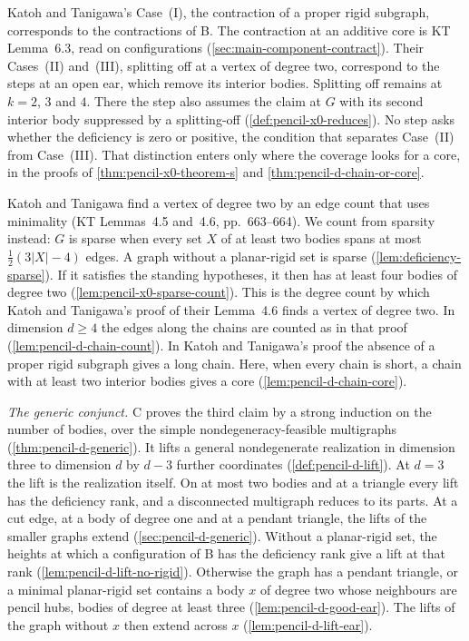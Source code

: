 Katoh and Tanigawa's Case~(I), the contraction of a proper rigid
subgraph, corresponds to the contractions of B. The contraction at an
additive core is KT Lemma~6.3, read on configurations
(\cref{sec:main-component-contract}). Their Cases~(II) and~(III),
splitting off at a vertex of degree two, correspond to the steps at an
open ear, which remove its interior bodies. Splitting off remains at $k
= 2$, $3$ and $4$. There the step also assumes the claim at $G$ with its
second interior body suppressed by a splitting-off
(\cref{def:pencil-x0-reduces}). No step asks whether the deficiency is
zero or positive, the condition that separates Case~(II) from
Case~(III). That distinction enters only where the coverage looks for a
core, in the proofs of \cref{thm:pencil-x0-theorem-s} and
\cref{thm:pencil-d-chain-or-core}.

Katoh and Tanigawa find a vertex of degree two by an edge count that
uses minimality (KT Lemmas~4.5 and~4.6, pp.~663--664). We count from
sparsity instead: $G$ is sparse when every set $X$ of at least two
bodies spans at most $\frac12(3|X| - 4)$ edges. A graph without a
planar-rigid set is sparse (\cref{lem:deficiency-sparse}). If it
satisfies the standing hypotheses, it then has at least four bodies of
degree two (\cref{lem:pencil-x0-sparse-count}). This is the degree count
by which Katoh and Tanigawa's proof of their Lemma~4.6 finds a vertex of
degree two. In dimension $d \ge 4$ the edges along the chains are
counted as in that proof (\cref{lem:pencil-d-chain-count}). In Katoh and
Tanigawa's proof the absence of a proper rigid subgraph gives a long
chain. Here, when every chain is short, a chain with at least two
interior bodies gives a core (\cref{lem:pencil-d-chain-core}).

\emph{The generic conjunct.} C proves the third claim by a strong
induction on the number of bodies, over the simple
nondegeneracy-feasible multigraphs (\cref{thm:pencil-d-generic}). It
lifts a general nondegenerate realization in dimension three to
dimension $d$ by $d - 3$ further coordinates (\cref{def:pencil-d-lift}).
At $d = 3$ the lift is the realization itself. On at most two bodies and
at a triangle every lift has the deficiency rank, and a disconnected
multigraph reduces to its parts. At a cut edge, at a body of degree one
and at a pendant triangle, the lifts of the smaller graphs extend
(\cref{sec:pencil-d-generic}). Without a planar-rigid set, the heights
at which a configuration of B has the deficiency rank give a lift at
that rank (\cref{lem:pencil-d-lift-no-rigid}). Otherwise the graph has a
pendant triangle, or a minimal planar-rigid set contains a body $x$ of
degree two whose neighbours are pencil hubs, bodies of degree at least
three (\cref{lem:pencil-d-good-ear}). The lifts of the graph without $x$
then extend across $x$ (\cref{lem:pencil-d-lift-ear}).

